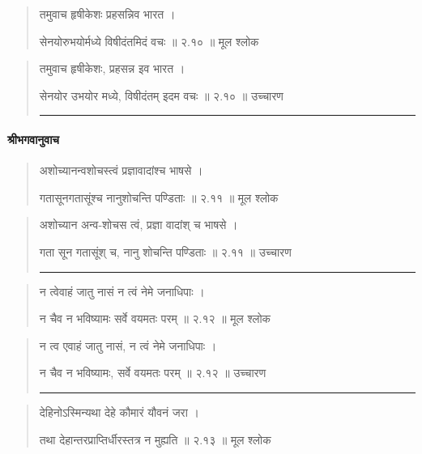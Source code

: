 \begin{quotation}

तमुवाच हृषीकेशः प्रहसन्निव भारत  ।  

सेनयोरुभयोर्मध्ये विषीदंतमिदं वचः  ॥ २.१० ॥  मूल श्लोक
\end{quotation}

\begin{quotation}

तमुवाच हृषीकेशः, प्रहसन्न इव भारत  ।  

सेनयोर उभयोर मध्ये, विषीदंतम् इदम वचः  ॥ २.१० ॥  उच्चारण

\noindent\rule{16cm}{0.4pt} 
\end{quotation}


\paragraph{\sanskrit श्रीभगवानुवाच}

\begin{quotation}
अशोच्यानन्वशोचस्त्वं प्रज्ञावादांश्च भाषसे  ।  

गतासूनगतासूंश्च नानुशोचन्ति पण्डिताः  ॥ २.११ ॥  मूल श्लोक
\end{quotation}

\begin{quotation}

अशोच्यान अन्व-शोचस त्वं, प्रज्ञा वादांश् च भाषसे  ।  

गता सून गतासूंश् च, नानु शोचन्ति पण्डिताः  ॥ २.११ ॥  उच्चारण

\noindent\rule{16cm}{0.4pt} 
\end{quotation}


\begin{quotation}

न त्वेवाहं जातु नासं न त्वं नेमे जनाधिपाः  ।  

न चैव न भविष्यामः सर्वे वयमतः परम्‌  ॥ २.१२ ॥  मूल श्लोक
\end{quotation}

\begin{quotation}

न त्व एवाहं जातु नासं, न त्वं नेमे जनाधिपाः  ।  

न चैव न भविष्यामः, सर्वे वयमतः परम्‌  ॥ २.१२ ॥  उच्चारण

\noindent\rule{16cm}{0.4pt} 
\end{quotation}


\begin{quotation}
देहिनोऽस्मिन्यथा देहे कौमारं यौवनं जरा  ।  

तथा देहान्तरप्राप्तिर्धीरस्तत्र न मुह्यति  ॥ २.१३ ॥  मूल श्लोक
\end{quotation}

